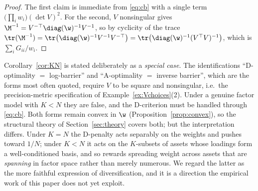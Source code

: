 \begin{proof}
The first claim is immediate from \eqref{eq:cb} with a single term
$\big(\prod_iw_i\big)(\det V)^2$. For the second, $V$ nonsingular gives
$\M^{-1}=V^{-\top}\diag(\w)^{-1}V^{-1}$, so by cyclicity of the trace
$\tr(\M^{-1})=\tr\big(\diag(\w)^{-1}V^{-1}V^{-\top}\big)
=\tr\big(\diag(\w)^{-1}(V^\top V)^{-1}\big)$, which is
$\sum_iG_{ii}/w_i$.
\end{proof}

\begin{remark}
\label{rem:scope}
Corollary~\ref{cor:KN} is stated deliberately as a \emph{special case}. The
identifications ``D-optimality $=$ log-barrier'' and ``A-optimality $=$ inverse
barrier'', which are the forms most often quoted, require $V$ to be square and
nonsingular, i.e.\ the precision-metric specification of
Example~\ref{ex:Vchoices}(2). Under a genuine factor model with $K<N$ they are
false, and the D-criterion must be handled through \eqref{eq:cb}. Both forms
remain convex in $\w$ (Proposition~\ref{prop:convex}), so the structural theory
of Section~\ref{sec:theory} covers both; but the interpretation differs. Under
$K=N$ the D-penalty acts separably on the weights and pushes toward $1/N$; under
$K<N$ it acts on the $K$-subsets of assets whose loadings form a well-conditioned
basis, and so rewards spreading weight across assets that are \emph{spanning} in
factor space rather than merely numerous. We regard the latter as the more
faithful expression of diversification, and it is a direction the empirical work
of this paper does not yet exploit.
\end{remark}

